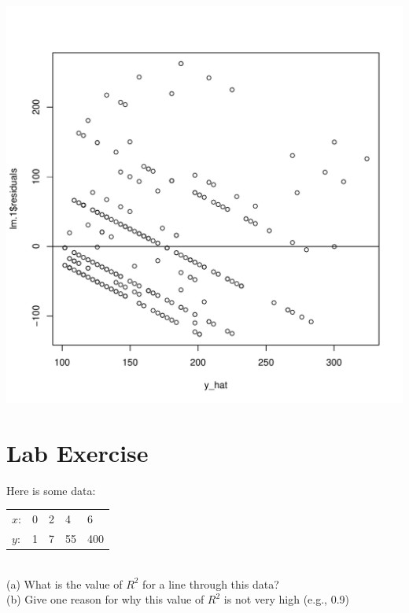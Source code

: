 \documentclass{article}
\begin{document}
\begin{center}
   \includegraphics[width=\textwidth]{img/Lab4_print_3.pdf} 
\end{center}


\clearpage
\section*{Lab Exercise}

Here is some data: \\

\begin{tabular}{ l l l l l }
	$x$: & 0 & 2 & 4 & 6 \\
	$y$: & 1 & 7 & 55 & 400 \\
\end{tabular} \\

(a) What is the value of $R^2$ for a line through this data? \\
(b) Give one reason for why this value of $R^2$ is not very high (e.g., 0.9) \\
\end{document}
